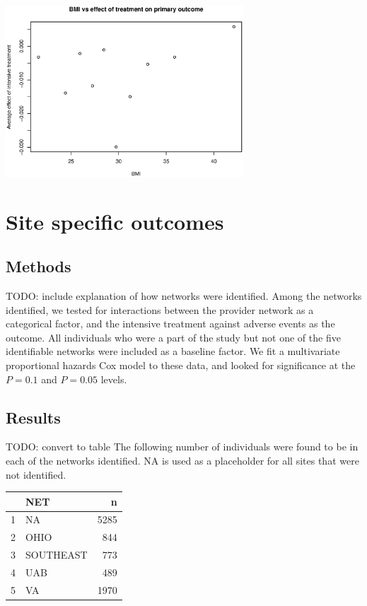 \documentclass[10pt]{article}
\begin{document}
\includegraphics[width=3.5in]{ate_bmi_interaction.eps}

\section{Site specific outcomes}
\subsection{Methods}
TODO: include explanation of how networks were identified.
Among the networks identified, we tested for interactions between the provider
network as a categorical factor, and the intensive treatment against adverse
events as the outcome. All individuals who were a part of the study but not one
of the five identifiable networks were included as a baseline factor. We fit a
multivariate proportional hazards Cox model to these data, and looked for
significance at the $P = 0.1$ and $P=0.05$ levels.

\subsection{Results}
TODO: convert to table
The following number of individuals were found to be in each of the networks
identified. NA is used as a placeholder for all sites that were not identified.

\begin{center}
\begin{tabular}{ |c|l|r| } 
 \hline
 &      \textbf{NET}&   \textbf{n} \\
 \hline
1&       NA&5285 \\
 \hline
2&     OHIO& 844 \\
 \hline
3&SOUTHEAST& 773 \\
 \hline
4      &UAB& 489 \\
 \hline
5      & VA&1970 \\
 \hline
\end{tabular}
\end{center}
\end{document}
